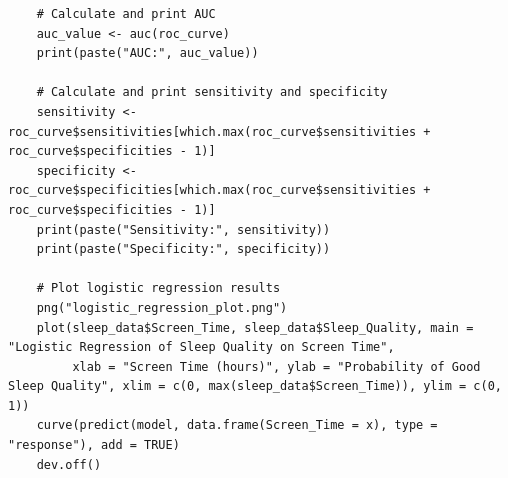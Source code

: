 \documentclass[conference]{IEEEtran}
\begin{document}
\begin{lstlisting}
    # Calculate and print AUC
    auc_value <- auc(roc_curve)
    print(paste("AUC:", auc_value))
    
    # Calculate and print sensitivity and specificity
    sensitivity <- roc_curve$sensitivities[which.max(roc_curve$sensitivities + roc_curve$specificities - 1)]
    specificity <- roc_curve$specificities[which.max(roc_curve$sensitivities + roc_curve$specificities - 1)]
    print(paste("Sensitivity:", sensitivity))
    print(paste("Specificity:", specificity))
    
    # Plot logistic regression results
    png("logistic_regression_plot.png")
    plot(sleep_data$Screen_Time, sleep_data$Sleep_Quality, main = "Logistic Regression of Sleep Quality on Screen Time",
         xlab = "Screen Time (hours)", ylab = "Probability of Good Sleep Quality", xlim = c(0, max(sleep_data$Screen_Time)), ylim = c(0, 1))
    curve(predict(model, data.frame(Screen_Time = x), type = "response"), add = TRUE)
    dev.off()

    
\end{lstlisting}
\end{document}
